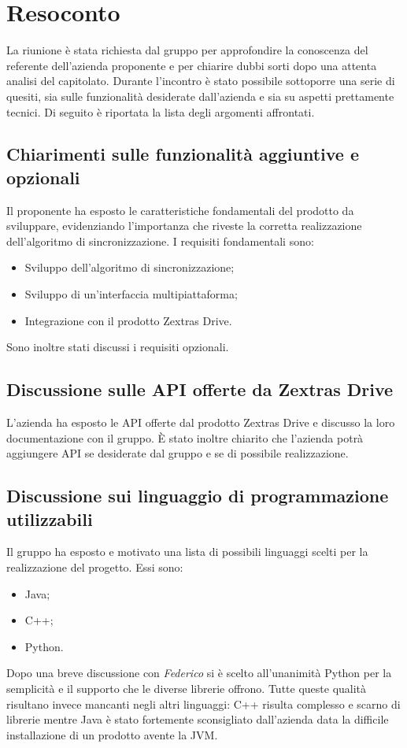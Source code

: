 \newpage


\section{Resoconto}
La riunione è stata richiesta dal gruppo \textit{\Gruppo{}} per approfondire la conoscenza del referente dell'azienda proponente e per chiarire dubbi sorti dopo una attenta analisi del capitolato.
Durante l'incontro è stato possibile sottoporre una serie di quesiti, sia sulle funzionalità desiderate dall'azienda e sia su aspetti prettamente tecnici.
Di seguito è riportata la lista degli argomenti affrontati.
\subsection{Chiarimenti sulle funzionalità aggiuntive e opzionali}
Il proponente ha esposto le caratteristiche fondamentali del prodotto da sviluppare, evidenziando l'importanza che riveste la corretta realizzazione dell'algoritmo di sincronizzazione.
I requisiti fondamentali sono:
\begin{itemize}
	\item Sviluppo dell'algoritmo di sincronizzazione;
	\item Sviluppo di un'interfaccia multipiattaforma;
	\item Integrazione con il prodotto Zextras Drive.
\end{itemize}
Sono inoltre stati discussi i requisiti opzionali.
\subsection{Discussione sulle API offerte da Zextras Drive}
L'azienda ha esposto le API offerte dal prodotto Zextras Drive e discusso la loro documentazione con il gruppo. È stato inoltre chiarito che l'azienda potrà aggiungere API se desiderate dal gruppo e se di possibile realizzazione.
\subsection{Discussione sui linguaggio di programmazione utilizzabili}
Il gruppo ha esposto e motivato una lista di possibili linguaggi scelti per la realizzazione del progetto. Essi sono:
\begin{itemize}
	\item Java;
	\item C++;
	\item Python.
\end{itemize}
Dopo una breve discussione con \textit{Federico} si è scelto all'unanimità Python per la semplicità e il supporto che le diverse librerie offrono. Tutte queste qualità risultano invece mancanti negli altri linguaggi: C++ risulta complesso e scarno di librerie mentre Java è stato fortemente sconsigliato dall'azienda data la difficile installazione di un prodotto avente la JVM.
